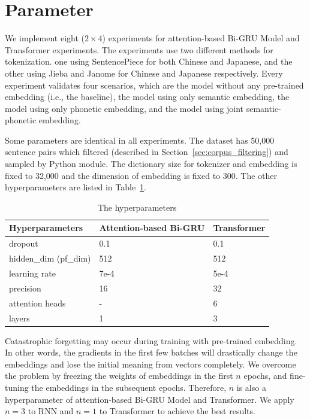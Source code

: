 \section{Parameter} \label{sec:parameter}

We implement eight ($2\!\times\!4$) experiments for attention-based Bi-GRU Model and Transformer experiments.
The experiments use two different methods for tokenization. one using SentencePiece for both Chinese and Japanese, and the other using Jieba and Janome for Chinese and Japanese respectively. Every experiment validates four scenarios, which are the model without any pre-trained embedding (i.e., the baseline), the model using only semantic embedding, the model using only phonetic embedding, and the model using joint semantic-phonetic embedding.

Some parameters are identical in all experiments. The dataset has 50,000 sentence pairs which filtered (described in Section~\ref{sec:corpus_filtering}) and sampled by Python  module. The dictionary size for tokenizer and embedding is fixed to 32,000 and the dimension of embedding is fixed to 300. The other hyperparameters are listed in Table~\ref{tab:hyperparameters}.

\vspace{0.4cm}
\begin{table}[h]
    \centering
    \begin{tabularx}{\textwidth}{bbb}\toprule
        Hyperparameters & Attention-based Bi-GRU & Transformer \\\midrule
        dropout & 0.1 & 0.1 \\
        hidden\_dim (pf\_dim) & 512 & 512 \\
        learning rate & 7e-4 & 5e-4 \\
        precision & 16 & 32 \\
        attention heads & - & 6 \\
        layers & 1 & 3 \\ 
        \bottomrule
    \end{tabularx}
    \caption{The hyperparameters}
    \label{tab:hyperparameters}
\end{table}

Catastrophic forgetting \cite{kirkpatrick2017overcoming} may occur during training with pre-trained embedding. In other words, the gradients in the first few batches will drastically change the embeddings and lose the initial meaning from vectors completely. We overcome the problem by freezing the weights of embeddings in the first $n$ epochs, and fine-tuning the embeddings in the subsequent epochs. Therefore, $n$ is also a hyperparameter of attention-based Bi-GRU Model and Transformer. We apply $n=3$ to RNN and $n=1$ to Transformer to achieve the best results.

